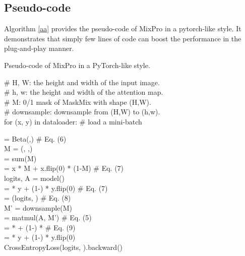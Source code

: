 \documentclass{article} \usepackage{iclr2023_conference,times}
\begin{document}
\subsection{Pseudo-code}
Algorithm \ref{aa} provides the pseudo-code of MixPro in a pytorch-like style. It demonstrates that simply few lines of code can boost the performance in the plug-and-play manner.


\begin{algorithm}[H]

\caption{ Pseudo-code of MixPro in a PyTorch-like style.}
\textcolor[RGB]{122,197,205}{\# H, W: the height and width of the input image.}\\
\textcolor[RGB]{122,197,205}{\# h, w: the height and width of the attention map.}\\
\textcolor[RGB]{122,197,205}{\# M: 0/1 mask of MaskMix with shape (H,W).}\\
\textcolor[RGB]{122,197,205}{\# downsample: downsample from (H,W) to (h,w).}\\

for (x, y) in dataloader: \textcolor[RGB]{122,197,205}{\# load a mini-batch}\\

\begin{algorithmic}
\STATE         = Beta(,) \textcolor[RGB]{122,197,205}{\# Eq. (6)}\\
\STATE        M = (, ,)\\
\STATE         = sum(M)\\
\STATE         = x * M + x.flip(0) * (1-M) \textcolor[RGB]{122,197,205}{\# Eq. (7)}\\
\STATE        logits, A = model() \\

\STATE         =  * y + (1-) * y.flip(0) \textcolor[RGB]{122,197,205}{\# Eq. (7)}\\
\STATE         = (logits, ) \textcolor[RGB]{122,197,205}{\# Eq. (8)}\\

\STATE        M' = downsample(M)\\
\STATE         = matmul(A, M') \textcolor[RGB]{122,197,205}{\# Eq. (5)}\\
\STATE         =  *  + (1-) *   \textcolor[RGB]{122,197,205}{\# Eq. (9)}\\
\STATE         =   * y + (1-) * y.flip(0) \\

\STATE        CrossEntropyLoss(logits, ).backward()\\
 \end{algorithmic}
    

\label{aa}
\end{algorithm}
\end{document}
